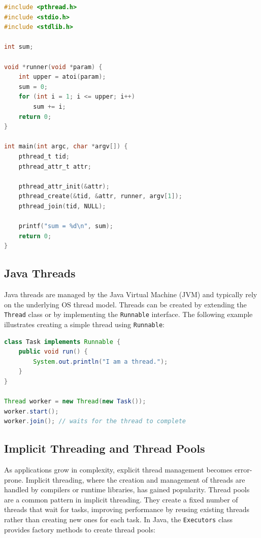 \begin{lstlisting}[language=C]
#include <pthread.h>
#include <stdio.h>
#include <stdlib.h>

int sum;

void *runner(void *param) {
    int upper = atoi(param);
    sum = 0;
    for (int i = 1; i <= upper; i++)
        sum += i;
    return 0;
}

int main(int argc, char *argv[]) {
    pthread_t tid;
    pthread_attr_t attr;

    pthread_attr_init(&attr);
    pthread_create(&tid, &attr, runner, argv[1]);
    pthread_join(tid, NULL);

    printf("sum = %d\n", sum);
    return 0;
}
\end{lstlisting}

\subsection{Java Threads}

Java threads are managed by the Java Virtual Machine (JVM) and typically rely on the underlying OS thread model. Threads can be created by extending the \texttt{Thread} class or by implementing the \texttt{Runnable} interface. The following example illustrates creating a simple thread using \texttt{Runnable}:

\begin{lstlisting}[language=Java]
class Task implements Runnable {
    public void run() {
        System.out.println("I am a thread.");
    }
}

Thread worker = new Thread(new Task());
worker.start();
worker.join(); // waits for the thread to complete
\end{lstlisting}

\subsection{Implicit Threading and Thread Pools}

As applications grow in complexity, explicit thread management becomes error-prone. Implicit threading, where the creation and management of threads are handled by compilers or runtime libraries, has gained popularity. Thread pools are a common pattern in implicit threading. They create a fixed number of threads that wait for tasks, improving performance by reusing existing threads rather than creating new ones for each task. In Java, the \texttt{Executors} class provides factory methods to create thread pools:

